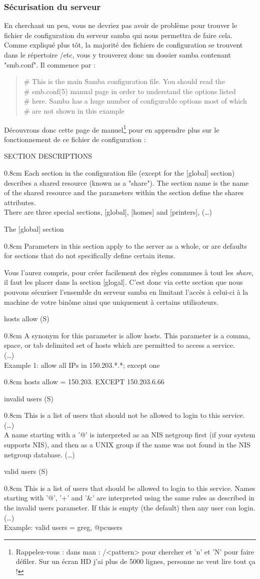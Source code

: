 \documentclass[a4paper,11pt]{article}
\newcommand{\commande}[1] {
    \begin{quote}
    \tt\raggedright #1 
    \end{quote}
}
\newcommand{\man}[2]{
    \begin{tcolorbox}[toprule=3mm,width=\textwidth,outer arc=0mm,colbacktitle=grayman,coltitle=black,colback={grayman},colframe={grayman},title={man : \tt #1}]
        \tt\raggedright #2
    \end{tcolorbox}
}
\newcommand{\mandesc}[1]{
    \begin{adjustwidth}{0.8cm}{}
        #1
    \end{adjustwidth}
}
\begin{document}
\subsubsection{Sécurisation du serveur}
\par En cherchant un peu, vous ne devriez pas avoir de problème pour trouver le fichier de configuration du serveur samba qui nous permettra de faire cela. Comme expliqué plus tôt, la majorité des fichiers de configuration se trouvent dans le répertoire /etc, vous y trouverez donc un dossier samba contenant "smb.conf". Il commence par :
\commande{\# This is the main Samba configuration file. You should read the\\
\# smb.conf(5) manual page in order to understand the options listed\\
\# here. Samba has a huge number of configurable options most of which\\
\# are not shown in this example}
\par Découvrons donc cette page de manuel\footnote{Rappelez-vous : dans man : /<pattern> pour chercher et 'n' et 'N' pour faire défiler. Sur un écran HD j'ai plus de 5000 lignes, personne ne veut lire tout ça !} pour en apprendre plus sur le fonctionnement de ce fichier de configuration :
\man{smb.conf}{
SECTION DESCRIPTIONS
\mandesc{Each section in the configuration file (except for the [global] section) describes a shared resource (known as a "share"). The section name is the name of the shared resource and the parameters within the section define the shares attributes.\\
There are three special sections, [global], [homes] and [printers], (\dots)}
The [global] section
\mandesc{Parameters in this section apply to the server as a whole, or are defaults for sections that do not specifically define certain items.}
}
\par Vous l'aurez compris, pour créer facilement des règles communes à tout les \emph{share}, il faut les placer dans la section [glogal]. C'est donc via cette section que nous pouvons sécuriser l'ensemble du serveur samba en limitant l'accès à celui-ci à la machine de votre binôme ainsi que uniquement à certains utilisateurs.
\man{smb.conf}{
hosts allow (S)
\mandesc{A synonym for this parameter is allow hosts. This parameter is a comma, space, or tab delimited set of hosts which are permitted to access a service.\\
(\dots)\\
Example 1: allow all IPs in 150.203.*.*; except one
\mandesc{hosts allow = 150.203. EXCEPT 150.203.6.66}
}
invalid users (S)
\mandesc{This is a list of users that should not be allowed to login to this service. (\dots)\\
A name starting with a '@' is interpreted as an NIS netgroup first (if your system supports NIS), and then as a UNIX group if the name was not found in the NIS netgroup database. (\dots)}
valid users (S)
\mandesc{This is a list of users that should be allowed to login to this service. Names starting with '@', '+' and '\&' are interpreted using the same rules as described in the invalid users parameter. If this is empty (the default) then any user can login. (\dots)\\
Example: valid users = greg, @pcusers}
}
\end{document}
